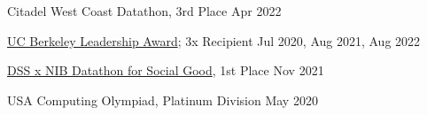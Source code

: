 Citadel West Coast Datathon, 3rd Place \hfill Apr 2022\par
\href{https://alumni.berkeley.edu/community/scholarships/leadership-award}{UC Berkeley Leadership Award}; 3x Recipient \hfill Jul 2020, Aug 2021, Aug 2022 \par
\href{https://www.facebook.com/events/933047190947185?}{DSS x NIB Datathon for Social Good}, 1st Place \hfill Nov 2021\par
USA Computing Olympiad, Platinum Division \hfill May 2020\par